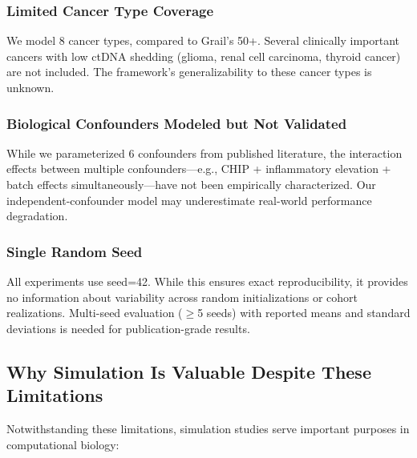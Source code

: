 \documentclass[10pt,a4paper]{article}
\begin{document}
\subsubsection{Limited Cancer Type Coverage}

We model 8 cancer types, compared to Grail's 50+. Several clinically important cancers with low ctDNA shedding (glioma, renal cell carcinoma, thyroid cancer) are not included. The framework's generalizability to these cancer types is unknown.

\subsubsection{Biological Confounders Modeled but Not Validated}

While we parameterized 6 confounders from published literature, the interaction effects between multiple confounders—e.g., CHIP + inflammatory elevation + batch effects simultaneously—have not been empirically characterized. Our independent-confounder model may underestimate real-world performance degradation.

\subsubsection{Single Random Seed}

All experiments use seed=42. While this ensures exact reproducibility, it provides no information about variability across random initializations or cohort realizations. Multi-seed evaluation ($\geq$5 seeds) with reported means and standard deviations is needed for publication-grade results.

\subsection{Why Simulation Is Valuable Despite These Limitations}

Notwithstanding these limitations, simulation studies serve important purposes in computational biology:
\end{document}

